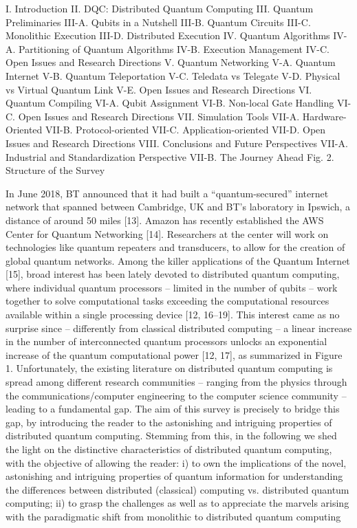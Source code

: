 I. Introduction II. DQC: Distributed Quantum Computing III. Quantum Preliminaries III-A. Qubits in a Nutshell III-B. Quantum Circuits III-C. Monolithic Execution III-D. Distributed Execution IV. Quantum Algorithms IV-A. Partitioning of Quantum Algorithms IV-B. Execution Management IV-C. Open Issues and Research Directions V. Quantum Networking V-A. Quantum Internet V-B. Quantum Teleportation V-C. Teledata vs Telegate V-D. Physical vs Virtual Quantum Link V-E. Open Issues and Research Directions VI. Quantum Compiling VI-A. Qubit Assignment VI-B. Non-local Gate Handling VI-C. Open Issues and Research Directions VII. Simulation Tools VII-A. Hardware-Oriented VII-B. Protocol-oriented VII-C. Application-oriented VII-D. Open Issues and Research Directions VIII. Conclusions and Future Perspectives VII-A. Industrial and Standardization Perspective VII-B. The Journey Ahead Fig. 2. Structure of the Survey 

In June 2018, BT announced that it had built a “quantum-secured” internet network that spanned between Cambridge, UK and BT’s laboratory in Ipswich, a distance of around 50 miles [13]. Amazon has recently established the AWS Center for Quantum Networking [14]. Researchers at the center will work on technologies like quantum repeaters and transducers, to allow for the creation of global quantum networks. Among the killer applications of the Quantum Internet [15], broad interest has been lately devoted to distributed quantum computing, where individual quantum processors – limited in the number of qubits – work together to solve computational tasks exceeding the computational resources available within a single processing device [12, 16–19]. This interest came as no surprise since – differently from classical distributed computing – a linear increase in the number of interconnected quantum processors unlocks an exponential increase of the quantum computational power [12, 17], as summarized in Figure 1. Unfortunately, the existing literature on distributed quantum computing is spread among different research communities – ranging from the physics through the communications/computer engineering to the computer science community – leading to a fundamental gap. The aim of this survey is precisely to bridge this gap, by introducing the reader to the astonishing and intriguing properties of distributed quantum computing. Stemming from this, in the following we shed the light on the distinctive characteristics of distributed quantum computing, with the objective of allowing the reader: i) to own the implications of the novel, astonishing and intriguing properties of quantum information for understanding the differences between distributed (classical) computing vs. distributed quantum computing; ii) to grasp the challenges as well as to appreciate the marvels arising with the paradigmatic shift from monolithic to distributed quantum computing


